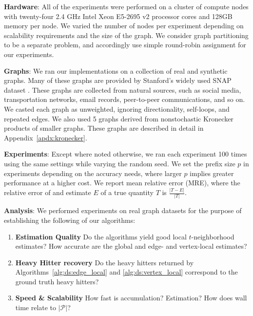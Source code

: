 \documentclass{vldb}
\begin{document}
\noindent
\textbf{Hardware}: 
All of the experiments were performed on a cluster of compute nodes with twenty-four 2.4 GHz Intel Xeon E5-2695 v2 processor cores and 128GB memory per node. 
We varied the number of nodes per experiment depending on scalability requirements and the size of the graph.
We consider graph partitioning to be a separate problem, and accordingly use simple round-robin assignment for our experiments.


\noindent
\textbf{Graphs}: 
We ran our implementations on a collection of real and synthetic graphs. 
Many of these graphs are provided by Stanford's widely used SNAP dataset \cite{snapnets}.
These graphs are collected from natural sources, such as social media, transportation networks, email records, peer-to-peer communications, and so on.
We casted each graph as unweighted, ignoring directionality, self-loops, and repeated edges. 
We also used 5 graphs derived from nonstochastic Kronecker products of smaller graphs.
These graphs are described in detail in Appendix~\ref{apdx:kronecker}.

\noindent
\textbf{Experiments}:
Except where noted otherwise, we ran each experiment 100 times using the same settings while varying the random seed.
We set the prefix size $p$ in experiments depending on the accuracy needs, where larger $p$ implies greater performance at a higher cost.
We report mean relative error (MRE), where the relative error of and estimate $E$ of a true quantity $T$ is $\frac{|T - E|}{|T|}$.

\noindent
\textbf{Analysis}: 
We performed experiments on real graph datasets for the purpose of establishing the following of our algorithms:
\begin{enumerate}
	\item \textbf{Estimation Quality} Do the algorithms yield good local $t$-neighborhood estimates? 
		How accurate are the global and edge- and vertex-local estimates? 
	\item \textbf{Heavy Hitter recovery	} Do the heavy hitters returned by Algorithms~\ref{alg:ds:edge_local} and \ref{alg:ds:vertex_local} correspond to the ground truth heavy hitters?
	\item \textbf{Speed \& Scalability} How fast is accumulation? Estimation? How does wall time relate to $|\mathcal{P}|$?
\end{enumerate}
\end{document}
